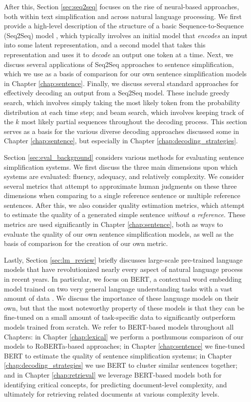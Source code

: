 \documentclass[thesis.tex]{subfiles}
\begin{document}
After this, Section \ref{sec:seq2seq} focuses on the rise of neural-based approaches, both within text simplification and across natural language processing. We first provide a high-level description of the structure of a basic Sequence-to-Sequence (Seq2Seq) model \citep{sutskever2014sequence}, which typically involves an initial model that \textit{encodes} an input into some latent representation, and a second model that takes this representation and uses it to \textit{decode} an output one token at a time. Next, we discuss several applications of Seq2Seq approaches to sentence simplification, which we use as a basis of comparison for our own sentence simplification models in Chapter \ref{chap:sentence}. Finally, we discuss several standard approaches for effectively decoding an output from a Seq2Seq model. These include greedy search, which involves simply taking the most likely token from the probability distribution at each time step; and beam search, which involves keeping track of the $k$ most likely partial sequences throughout the decoding process. This section serves as a basis for the various diverse decoding approaches discussed some in Chapter \ref{chap:sentence}, but especially in Chapter \ref{chap:decoding_strategies}.

Section \ref{sec:eval_background} considers various methods for evaluating sentence simplification systems. We first discuss the three main dimensions upon which systems are evaluated: fluency, adequacy, and relatively complexity. We consider several metrics that attempt to approximate human judgments on these three dimensions when comparing to a single reference sentence or multiple reference sentences. After this, we also consider quality estimation metrics, which attempt to estimate the quality of a generated simple sentence \textit{without a reference}. These metrics are used significantly in Chapter \ref{chap:sentence}, both as ways to evaluate the quality of our own sentence simplification models, as well as the basis of comparison for the creation of our own metric.


Lastly, Section \ref{sec:lm_review} briefly discusses large-scale pre-trained language models that have revolutionized nearly every aspect of natural language process in recent years. In particular, we focus on BERT, a contextual word embedding model trained on two very general language understanding tasks with a vast amount of data \citep{devlin2019bert}. We discuss the importance of these language models on their own, but that the most noteworthy property of these models is that they can be fine-tuned on a small amount of task-specific data to significantly outperform models trained from scratch. We refer to BERT-based models throughout all Chapters: in Chapter \ref{chap:lexical} we perform a posthumous comparison of our models to RoBERTa-based approaches; in Chapter \ref{chap:sentence} we fine-tuned BERT to estimate the quality of sentence simplification systems; in Chapter \ref{chap:decoding_strategies} we use BERT to cluster similar sentences together; and in Chapter \ref{chap:retrieval} we leverage BERT-based models both for identifying critical concepts, for predicting document-level complexity, and ultimately for retrieving related documents at various complexity levels.
\end{document}
